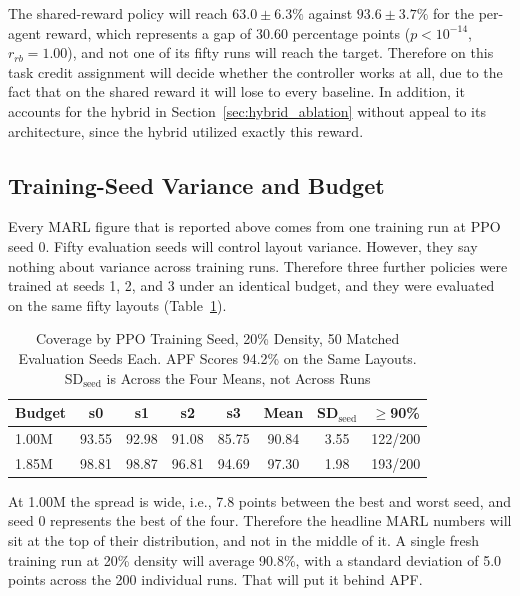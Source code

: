 \documentclass[a4paper, 10pt, conference]{ieeeconf}
\begin{document}
The shared-reward policy will reach $63.0\pm6.3\%$ against
$93.6\pm3.7\%$ for the per-agent reward, which represents a gap of
$30.60$ percentage points ($p<10^{-14}$, $r_{rb}=1.00$), and not one
of its fifty runs will reach the target. Therefore on this task credit
assignment will decide whether the controller works at all, due to the
fact that on the shared reward it will lose to every baseline. In
addition, it accounts for the hybrid in
Section~\ref{sec:hybrid_ablation} without appeal to its architecture,
since the hybrid utilized exactly this reward.

\subsection{Training-Seed Variance and Budget}\label{sec:seedvar}

Every MARL figure that is reported above comes from one training run
at PPO seed 0. Fifty evaluation seeds will control layout variance.
However, they say nothing about variance across training runs.
Therefore three further policies were trained at seeds 1, 2, and 3
under an identical budget, and they were evaluated on the same fifty
layouts (Table~\ref{tab:seedvar}).

\begin{table}[htb]
\centering
\caption{Coverage by PPO Training Seed, 20\% Density, 50 Matched
Evaluation Seeds Each. APF Scores 94.2\% on the Same Layouts.
SD$_{\text{seed}}$ is Across the Four Means, not Across Runs}
\label{tab:seedvar}
\scriptsize
\setlength{\tabcolsep}{2pt}
\begin{tabular}{lccccccc}
\toprule
\textbf{Budget} & \textbf{s0} & \textbf{s1} & \textbf{s2} &
\textbf{s3} & \textbf{Mean} & \textbf{SD$_{\text{seed}}$} &
\textbf{$\geq$90\%} \\
\midrule
1.00M & 93.55 & 92.98 & 91.08 & 85.75 & 90.84 & 3.55 & 122/200 \\
1.85M & 98.81 & 98.87 & 96.81 & 94.69 & 97.30 & 1.98 & 193/200 \\
\bottomrule
\end{tabular}
\end{table}

At 1.00M the spread is wide, i.e., 7.8 points between the best and
worst seed, and seed 0 represents the best of the four. Therefore the
headline MARL numbers will sit at the top of their distribution, and
not in the middle of it. A single fresh training run at 20\% density
will average 90.8\%, with a standard deviation of 5.0 points across
the 200 individual runs. That will put it behind APF.
\end{document}
